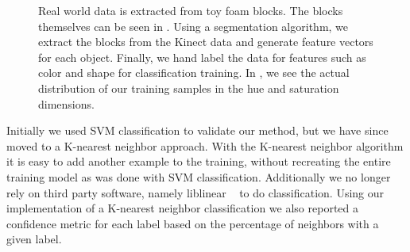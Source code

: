 \documentclass[11pt]{article}
\begin{document}
\begin{figure}[h!]
\centering
{}
\caption{Real world data is extracted from toy foam blocks. The blocks
    themselves can be seen in . Using a segmentation
    algorithm, we extract the blocks from the Kinect data 
    and generate feature vectors for each object.
    Finally, we hand label the data for features such as color and shape for
    classification training. In , we see the actual
    distribution of our training samples in the hue and saturation
    dimensions.}
\label{fig:objects}
\end{figure}



Initially we used SVM classification to validate our method, but we have since 
moved to a K-nearest neighbor approach.  With the K-nearest neighbor algorithm 
it is easy to add another example to the training, without recreating the 
entire training model as was done with SVM classification.  Additionally we no 
longer rely on third party software, namely liblinear ~\cite{LIBLINEAR} to do 
classification.  Using our implementation of a K-nearest neighbor 
classification we also reported a confidence metric for each label based on the 
percentage of neighbors with a given label.
\end{document}
